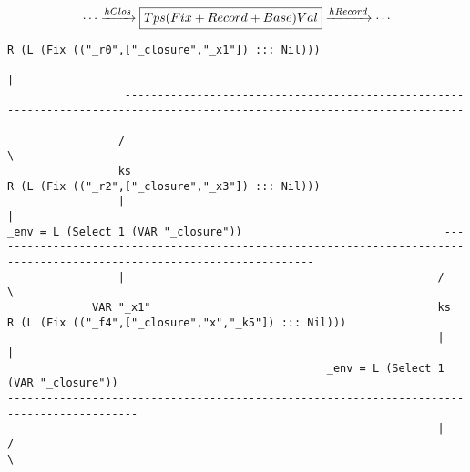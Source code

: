 \begin{landscape}
\begin{gather*}
  \cdots \xrightarrow{hClos} \boxed{Tps (Fix + Record + Base) Val} \xrightarrow{hRecord} \cdots
\end{gather*}
\begin{lstlisting}[basicstyle=\fontsize{4.5}{5.5}\selectfont\ttfamily]
                                                                                                                   R (L (Fix (("_r0",["_closure","_x1"]) ::: Nil)))
                                                                                                                                          |
                  -------------------------------------------------------------------------------------------------------------------------------------------
                 /                                                                                                                                           \
                 ks                                                                                                                   R (L (Fix (("_r2",["_closure","_x3"]) ::: Nil)))
                 |                                                                                                                                           |
_env = L (Select 1 (VAR "_closure"))                               ------------------------------------------------------------------------------------------------------------------------
                 |                                                /                                                                                                                        \
             VAR "_x1"                                            ks                                                                                              R (L (Fix (("_f4",["_closure","x","_k5"]) ::: Nil)))
                                                                  |                                                                                                                        |
                                                 _env = L (Select 1 (VAR "_closure"))                                                                        ------------------------------------------------------------------------------------------
                                                                  |                                                                                         /                                                                                          \

\end{lstlisting}
\end{landscape}
